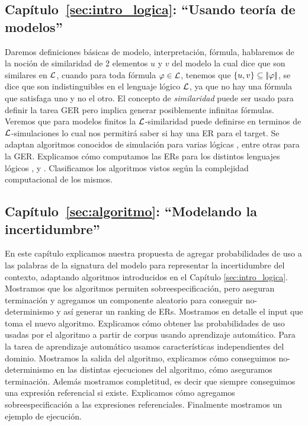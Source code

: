 \subsection{Cap\'itulo~\ref{sec:intro_logica}: ``Usando teor\'ia de modelos''} 
Daremos definiciones b\'asicas de modelo, 
interpretaci\'on, f\'ormula, hablaremos de la noci\'on de similaridad de 2 elementos $u$ y $v$ del modelo la cual dice que son 
similares en $\mathcal{L}$, cuando para toda f\'ormula $\varphi \in \mathcal{L}$, tenemos que 
$\{u,v\} \subseteq |\!|\varphi|\!|$, se dice que son indistinguibles en el lenguaje l\'ogico $\mathcal{L}$, ya que no hay una f\'ormula que satisfaga uno 
y no el otro. El concepto de \emph{similaridad} puede ser usado para definir la tarea GER pero implica generar posiblemente infinitas f\'ormulas. Veremos que para modelos finitos la $\mathcal{L}$-similaridad puede definirse en terminos de $\mathcal{L}$-simulaciones lo cual nos permitir\'a saber si hay una ER para el target. Se adaptan algoritmos conocidos de simulaci\'on para varias l\'ogicas \ALC, \EL entre otras para la GER. Explicamos c\'omo computamos las ERs para los distintos lenguajes l\'ogicos \FOL, \ALC y \EL. Clasificamos los algoritmos vistos seg\'un la complejidad computacional de los mismos. 

\subsection{Cap\'itulo~\ref{sec:algoritmo}: ``Modelando la incertidumbre''} 
En este cap\'itulo 
explicamos nuestra propuesta de agregar probabilidades de uso a las palabras de la signatura del modelo para representar la incertidumbre del contexto, adaptando algoritmos introducidos en el Cap\'itulo \ref{sec:intro_logica}. Mostramos que los algoritmos permiten sobreespecificaci\'on, 
pero aseguran terminaci\'on y agregamos un componente aleatorio para conseguir no-determinismo y as\'i generar un ranking de ERs. Mostramos en detalle el input que toma el
 nuevo algoritmo. Explicamos c\'omo obtener las probabilidades de uso usadas por el algoritmo a partir de corpus usando aprendizaje autom\'atico. Para la tarea de aprendizaje autom\'atico usamos caracter\'isticas independientes del dominio. 
Mostramos la salida del algoritmo, explicamos c\'omo conseguimos no-determinismo en las distintas ejecuciones del algoritmo, c\'omo aseguramos 
terminaci\'on. Adem\'as mostramos completitud, es decir que siempre conseguimos una expresi\'on referencial si existe. Explicamos c\'omo agregamos sobreespecificaci\'on a las expresiones referenciales. Finalmente mostramos un ejemplo de ejecuci\'on. 

